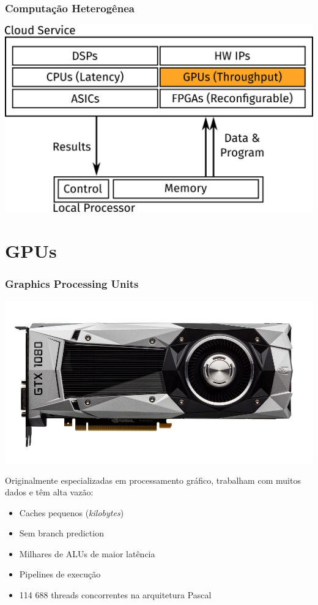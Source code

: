 \documentclass[10pt, compress]{beamer}
\begin{document}
\begin{frame}
    \frametitle{Computação Heterogênea}
    \centering
    \includegraphics[width=.85\textwidth]{heterogeneous_highlight}
\end{frame}

\section{GPUs}

\begin{frame}
    \frametitle{Graphics Processing Units}
    \begin{center}
        \includegraphics[width=.6\textwidth]{gtx1080}
    \end{center}

    Originalmente especializadas em \alert{processamento gráfico},
    trabalham com muitos dados e têm \alert{alta vazão}:
    \begin{itemize}
        \item Caches pequenos (\textit{kilobytes})
            \pause
        \item Sem \alert{branch prediction}
            \pause
        \item \alert{Milhares} de ALUs de \alert{maior latência}
            \pause
        \item \alert{Pipelines} de execução
            \pause
        \item 114 688 \alert{threads} concorrentes na arquitetura Pascal
    \end{itemize}
\end{frame}
\end{document}
